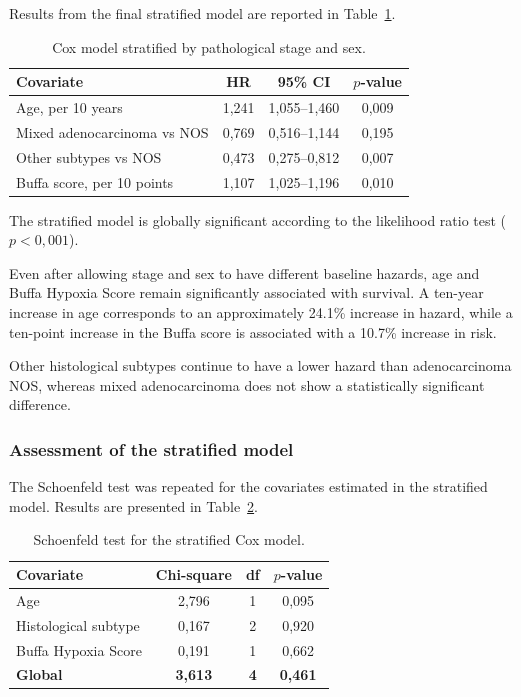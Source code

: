 \documentclass[12pt,a4paper]{article}
\begin{document}
Results from the final stratified model are reported in Table~\ref{tab:cox_stratificato}.

\begin{table}[H]
\centering
\caption{Cox model stratified by pathological stage and sex.}
\label{tab:cox_stratificato}
\renewcommand{\arraystretch}{1.15}
\small
\begin{tabular}{l c c c}
\toprule
\textbf{Covariate}
& \textbf{HR}
& \textbf{95\% CI}
& \textbf{$p$-value} \\
\midrule
Age, per 10 years
& 1,241
& 1,055--1,460
& 0,009 \\

Mixed adenocarcinoma vs NOS
& 0,769
& 0,516--1,144
& 0,195 \\

Other subtypes vs NOS
& 0,473
& 0,275--0,812
& 0,007 \\

Buffa score, per 10 points
& 1,107
& 1,025--1,196
& 0,010 \\
\bottomrule
\end{tabular}
\end{table}

The stratified model is globally significant according to the likelihood ratio test ($p<0,001$).

Even after allowing stage and sex to have different baseline hazards, age and Buffa Hypoxia Score remain significantly associated with survival. A ten-year increase in age corresponds to an approximately 24.1\% increase in hazard, while a ten-point increase in the Buffa score is associated with a 10.7\% increase in risk.

Other histological subtypes continue to have a lower hazard than adenocarcinoma NOS, whereas mixed adenocarcinoma does not show a statistically significant difference.

\subsubsection{Assessment of the stratified model}

The Schoenfeld test was repeated for the covariates estimated in the stratified model. Results are presented in Table~\ref{tab:schoenfeld_stratificato}.

\begin{table}[H]
\centering
\caption{Schoenfeld test for the stratified Cox model.}
\label{tab:schoenfeld_stratificato}
\renewcommand{\arraystretch}{1.15}
\begin{tabular}{l c c c}
\toprule
\textbf{Covariate}
& \textbf{Chi-square}
& \textbf{df}
& \textbf{$p$-value} \\
\midrule
Age
& 2,796
& 1
& 0,095 \\

Histological subtype
& 0,167
& 2
& 0,920 \\

Buffa Hypoxia Score
& 0,191
& 1
& 0,662 \\

\textbf{Global}
& \textbf{3,613}
& \textbf{4}
& \textbf{0,461} \\
\bottomrule
\end{tabular}
\end{table}
\end{document}
